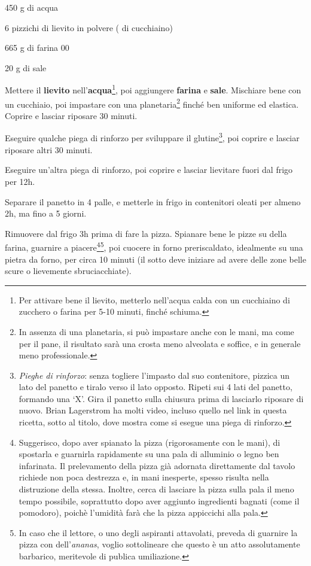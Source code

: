 \newpage
{}


\begin{ingredients}
	\item 450 g di acqua
	\item 6 pizzichi di lievito in polvere ( di cucchiaino)
	\item 665 g di farina 00
	\item 20 g di sale
\end{ingredients}


\medskip

Mettere il \textbf{lievito} nell'\textbf{acqua}\footnote{Per attivare bene il lievito, metterlo nell'acqua calda con un cucchiaino di zucchero o farina per 5-10 minuti, finché schiuma.}, poi aggiungere \textbf{farina} e \textbf{sale}. 
Mischiare bene con un cucchiaio, poi impastare con una planetaria\footnote{In assenza di una planetaria, si può impastare anche con le mani, ma come per il pane, il risultato sarà una crosta meno alveolata e soffice, e in generale meno professionale.} finché ben uniforme ed elastica. 
Coprire e lasciar riposare 30 minuti. 

Eseguire qualche piega di rinforzo per sviluppare il glutine\footnote{\textit{Pieghe di rinforzo}: senza togliere l'impasto dal suo contenitore, pizzica un lato del panetto e tiralo verso il lato opposto. Ripeti sui 4 lati del panetto, formando una `X'. Gira il panetto sulla chiusura prima di lasciarlo riposare di nuovo. Brian Lagerstrom ha molti video, incluso quello nel link in questa ricetta, sotto al titolo, dove mostra come si esegue una piega di rinforzo.}, poi coprire e lasciar riposare altri 30 minuti.

Eseguire un'altra piega di rinforzo, poi coprire e lasciar lievitare fuori dal frigo per 12h.

Separare il panetto in 4 palle, e metterle in frigo in contenitori oleati per almeno 2h, ma fino a 5 giorni.

Rimuovere dal frigo 3h prima di fare la pizza.
Spianare bene le pizze su della farina, guarnire a piacere\footnote{Suggerisco, dopo aver spianato la pizza (rigorosamente con le mani), di spostarla e guarnirla rapidamente su una pala di alluminio o legno ben infarinata. Il prelevamento della pizza già adornata direttamente dal tavolo richiede non poca destrezza e, in mani inesperte, spesso risulta nella distruzione della stessa. Inoltre, cerca di lasciare la pizza sulla pala il meno tempo possibile, soprattutto dopo aver aggiunto ingredienti bagnati (come il pomodoro), poichè l'umidità farà che la pizza appiccichi alla pala.}\footnote{In caso che il lettore, o uno degli aspiranti attavolati, preveda di guarnire la pizza con dell'\textit{ananas}, voglio sottolineare che questo è un atto assolutamente barbarico, meritevole di publica umiliazione.}, poi cuocere in forno preriscaldato, idealmente su una pietra da forno, per circa 10 minuti (il sotto deve iniziare ad avere delle zone belle scure o lievemente sbruciacchiate). 

